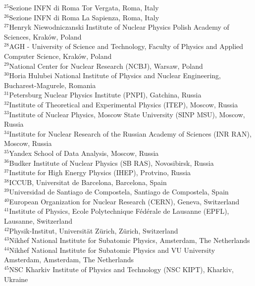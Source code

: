 \begin{flushleft}
{$ ^{25}$Sezione INFN di Roma Tor Vergata, Roma, Italy\\
$ ^{26}$Sezione INFN di Roma La Sapienza, Roma, Italy\\
$ ^{27}$Henryk Niewodniczanski Institute of Nuclear Physics  Polish Academy of Sciences, Krak{\'o}w, Poland\\
$ ^{28}$AGH - University of Science and Technology, Faculty of Physics and Applied Computer Science, Krak{\'o}w, Poland\\
$ ^{29}$National Center for Nuclear Research (NCBJ), Warsaw, Poland\\
$ ^{30}$Horia Hulubei National Institute of Physics and Nuclear Engineering, Bucharest-Magurele, Romania\\
$ ^{31}$Petersburg Nuclear Physics Institute (PNPI), Gatchina, Russia\\
$ ^{32}$Institute of Theoretical and Experimental Physics (ITEP), Moscow, Russia\\
$ ^{33}$Institute of Nuclear Physics, Moscow State University (SINP MSU), Moscow, Russia\\
$ ^{34}$Institute for Nuclear Research of the Russian Academy of Sciences (INR RAN), Moscow, Russia\\
$ ^{35}$Yandex School of Data Analysis, Moscow, Russia\\
$ ^{36}$Budker Institute of Nuclear Physics (SB RAS), Novosibirsk, Russia\\
$ ^{37}$Institute for High Energy Physics (IHEP), Protvino, Russia\\
$ ^{38}$ICCUB, Universitat de Barcelona, Barcelona, Spain\\
$ ^{39}$Universidad de Santiago de Compostela, Santiago de Compostela, Spain\\
$ ^{40}$European Organization for Nuclear Research (CERN), Geneva, Switzerland\\
$ ^{41}$Institute of Physics, Ecole Polytechnique  F{\'e}d{\'e}rale de Lausanne (EPFL), Lausanne, Switzerland\\
$ ^{42}$Physik-Institut, Universit{\"a}t Z{\"u}rich, Z{\"u}rich, Switzerland\\
$ ^{43}$Nikhef National Institute for Subatomic Physics, Amsterdam, The Netherlands\\
$ ^{44}$Nikhef National Institute for Subatomic Physics and VU University Amsterdam, Amsterdam, The Netherlands\\
$ ^{45}$NSC Kharkiv Institute of Physics and Technology (NSC KIPT), Kharkiv, Ukraine\\
}
\end{flushleft}
